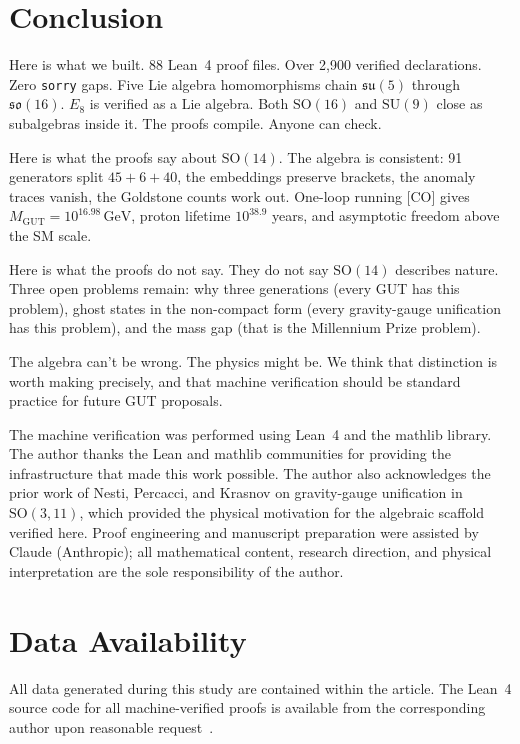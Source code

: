 \documentclass[aps,prd,twocolumn,showpacs,preprintnumbers,superscriptaddress,floatfix]{revtex4-2}
\newcommand{\so}{\mathfrak{so}}
\newcommand{\su}{\mathfrak{su}}
\newcommand{\GeV}{\,\mathrm{GeV}}
\begin{document}
\section{Conclusion}
\label{sec:conclusion}

Here is what we built.  88 Lean~4 proof files. Over 2,900 verified
declarations. Zero \texttt{sorry} gaps.  Five Lie algebra homomorphisms
chain $\su(5)$ through $\so(16)$.  $E_8$ is verified as a Lie algebra.
Both $\mathrm{SO}(16)$ and $\mathrm{SU}(9)$ close as subalgebras inside it.
The proofs compile.  Anyone can check.

Here is what the proofs say about $\mathrm{SO}(14)$.  The algebra is
consistent: 91 generators split $45 + 6 + 40$, the embeddings preserve
brackets, the anomaly traces vanish, the Goldstone counts work out.
One-loop running [CO] gives $M_\text{GUT} = 10^{16.98}\GeV$, proton
lifetime $10^{38.9}$ years, and asymptotic freedom above the SM scale.

Here is what the proofs do not say.  They do not say $\mathrm{SO}(14)$
describes nature.  Three open problems remain: why three generations
(every GUT has this problem), ghost states in the non-compact form
(every gravity-gauge unification has this problem), and the mass gap
(that is the Millennium Prize problem).

The algebra can't be wrong.  The physics might be.  We think that
distinction is worth making precisely, and that machine verification
should be standard practice for future GUT proposals.

\begin{acknowledgments}
The machine verification was performed using Lean~4 and the mathlib
library.  The author thanks the Lean and mathlib communities for providing
the infrastructure that made this work possible.  The author also
acknowledges the prior work of Nesti, Percacci, and Krasnov on
gravity-gauge unification in $\mathrm{SO}(3,11)$, which provided the
physical motivation for the algebraic scaffold verified here.
Proof engineering and manuscript preparation were assisted by Claude
(Anthropic); all mathematical content, research direction, and
physical interpretation are the sole responsibility of the author.
\end{acknowledgments}

\section*{Data Availability}
All data generated during this study are contained within the article.
The Lean~4 source code for all machine-verified proofs is available
from the corresponding author upon reasonable request~\cite{uft-github}.
\end{document}
